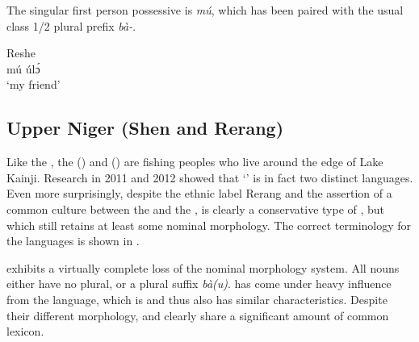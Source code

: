 \documentclass[output=paper]{langsci/langscibook}
\begin{document}
\newpage 
The singular first person possessive is \textit{mú}, which has been paired with the usual class 1/2 plural prefix \textit{bà-}.

\ea
{Reshe}\\ 
\gll mú úlɔ́\\
  ‘my	 friend’\\
\z

\subsection{Upper Niger (Shen and Rerang)}

Like the , the  () and  () are fishing peoples who live around the edge of Lake Kainji. Research in 2011 and 2012 showed that ‘’ is in fact two distinct languages. Even more surprisingly, despite the ethnic label Rerang and the assertion of a common culture between the  and the ,  is clearly a conservative type of , but which still retains at least some nominal morphology. The correct terminology for the  languages is shown in .

\begin{table}
\caption{\label{tab:kainji:4} Ethnonyms and reference names of the Upper Niger Group}
\end{table}

 exhibits a virtually complete loss of the nominal morphology system. All nouns either have no plural, or a plural suffix \textit{bà(u)}.  has come under heavy influence from the  language, which is  and thus also has similar characteristics. Despite their different morphology,  and  clearly share a significant amount of common lexicon.
\end{document}
